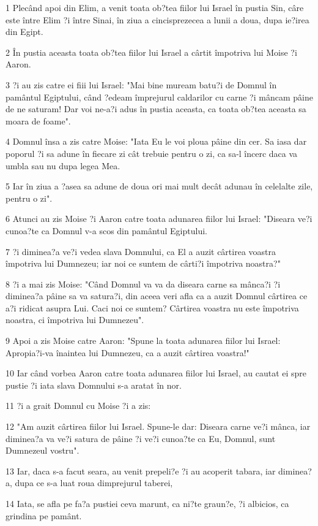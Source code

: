 \par 1 Plecând apoi din Elim, a venit toata ob?tea fiilor lui Israel în pustia Sin, câre este între Elim ?i între Sinai, în ziua a cincisprezecea a lunii a doua, dupa ie?irea din Egipt.
\par 2 În pustia aceasta toata ob?tea fiilor lui Israel a cârtit împotriva lui Moise ?i Aaron.
\par 3 ?i au zis catre ei fiii lui Israel: "Mai bine muream batu?i de Domnul în pamântul Egiptului, când ?edeam împrejurul caldarilor cu carne ?i mâncam pâine de ne saturam! Dar voi ne-a?i adus în pustia aceasta, ca toata ob?tea aceasta sa moara de foame".
\par 4 Domnul însa a zis catre Moise: "Iata Eu le voi ploua pâine din cer. Sa iasa dar poporul ?i sa adune în fiecare zi cât trebuie pentru o zi, ca sa-l încerc daca va umbla sau nu dupa legea Mea.
\par 5 Iar în ziua a ?asea sa adune de doua ori mai mult decât adunau în celelalte zile, pentru o zi".
\par 6 Atunci au zis Moise ?i Aaron catre toata adunarea fiilor lui Israel: "Diseara ve?i cunoa?te ca Domnul v-a scos din pamântul Egiptului.
\par 7 ?i diminea?a ve?i vedea slava Domnului, ca El a auzit cârtirea voastra împotriva lui Dumnezeu; iar noi ce suntem de cârti?i împotriva noastra?"
\par 8 ?i a mai zis Moise: "Când Domnul va va da diseara carne sa mânca?i ?i diminea?a pâine sa va satura?i, din aceea veri afla ca a auzit Domnul cârtirea ce a?i ridicat asupra Lui. Caci noi ce suntem? Cârtirea voastra nu este împotriva noastra, ci împotriva lui Dumnezeu".
\par 9 Apoi a zis Moise catre Aaron: "Spune la toata adunarea fiilor lui Israel: Apropia?i-va înaintea lui Dumnezeu, ca a auzit cârtirea voastra!"
\par 10 Iar când vorbea Aaron catre toata adunarea fiilor lui Israel, au cautat ei spre pustie ?i iata slava Domnului s-a aratat în nor.
\par 11 ?i a grait Domnul cu Moise ?i a zis:
\par 12 "Am auzit cârtirea fiilor lui Israel. Spune-le dar: Diseara carne ve?i mânca, iar diminea?a va ve?i satura de pâine ?i ve?i cunoa?te ca Eu, Domnul, sunt Dumnezeul vostru".
\par 13 Iar, daca s-a facut seara, au venit prepeli?e ?i au acoperit tabara, iar diminea?a, dupa ce s-a luat roua dimprejurul taberei,
\par 14 Iata, se afla pe fa?a pustiei ceva marunt, ca ni?te graun?e, ?i albicios, ca grindina pe pamânt.

